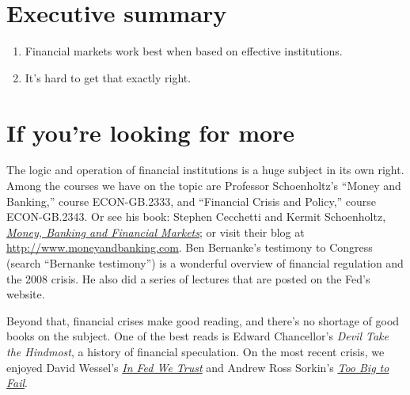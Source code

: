 \section*{Executive summary}

\begin{enumerate}
\item Financial markets work best when based on effective institutions.
\item It's hard to get that exactly right.
\end{enumerate}


\begin{comment}
\section*{Review questions}

\begin{enumerate}

\item ...
\end{enumerate}
\end{comment}

\section*{If you're looking for more}

The logic and operation of financial institutions is a huge subject
in its own right.
Among the courses we have on the topic are Professor Schoenholtz's
``Money and Banking,'' course ECON-GB.2333,
and ``Financial Crisis and Policy,'' course ECON-GB.2343.
Or see his book:
Stephen Cecchetti and Kermit Schoenholtz,
\href{http://www.amazon.com/dp/007802174X/}
{\it Money, Banking and Financial Markets\/}; or visit their blog at \url{http://www.moneyandbanking.com}.
Ben Bernanke's  testimony to Congress (search ``Bernanke 
 testimony'')
is a wonderful overview of financial regulation and the 2008 crisis.
He also did a series of lectures that are posted on the Fed's website.

Beyond that, financial crises make good reading, and there's no shortage
of good books on the subject.
One of the best reads is Edward Chancellor's {\it Devil Take the Hindmost\/},
a history of financial speculation.
On the most recent crisis,
we enjoyed David Wessel's
\href{http://www.amazon.com/FED-We-Trust-Bernankes-Great/dp/0307459691/}
{\it In Fed We Trust\/}
and Andrew Ross Sorkin's
\href{http://www.amazon.com/Too-Big-Fail-Washington-FinancialSystem/dp/0143120271/}
{\it Too Big to Fail\/}.
